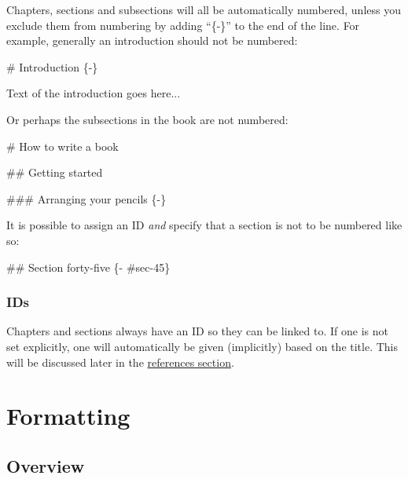 \documentclass[
  english,
]{book}
\newenvironment{Shaded}{\begin{snugshade}}{\end{snugshade}}
\newcommand{\FunctionTok}[1]{\textcolor[rgb]{0.00,0.00,0.00}{#1}}
\newcommand{\NormalTok}[1]{#1}
\begin{document}
Chapters, sections and subsections will all be automatically numbered, unless you exclude them from numbering by adding ``\{-\}'' to the end of the line. For example, generally an introduction should not be numbered:

\begin{Shaded}
\begin{Highlighting}[]
\FunctionTok{\# Introduction \{{-}\}}

\NormalTok{Text of the introduction goes here...}
\end{Highlighting}
\end{Shaded}

Or perhaps the subsections in the book are not numbered:

\begin{Shaded}
\begin{Highlighting}[]
\FunctionTok{\# How to write a book}

\FunctionTok{\#\# Getting started}

\FunctionTok{\#\#\# Arranging your pencils \{{-}\}}
\end{Highlighting}
\end{Shaded}

It is possible to assign an ID \emph{and} specify that a section is not to be numbered like so:

\begin{Shaded}
\begin{Highlighting}[]
\FunctionTok{\#\# Section forty{-}five \{{-} \#sec{-}45\}}
\end{Highlighting}
\end{Shaded}

\hypertarget{ids}{%
\subsection{IDs}\label{ids}}

Chapters and sections always have an ID so they can be linked to. If one is not set explicitly, one will automatically be given (implicitly) based on the title. This will be discussed later in the \protect\hyperlink{references}{references section}.

\hypertarget{formatting}{%
\chapter{Formatting}\label{formatting}}

\hypertarget{overview}{%
\section{Overview}\label{overview}}
\end{document}
